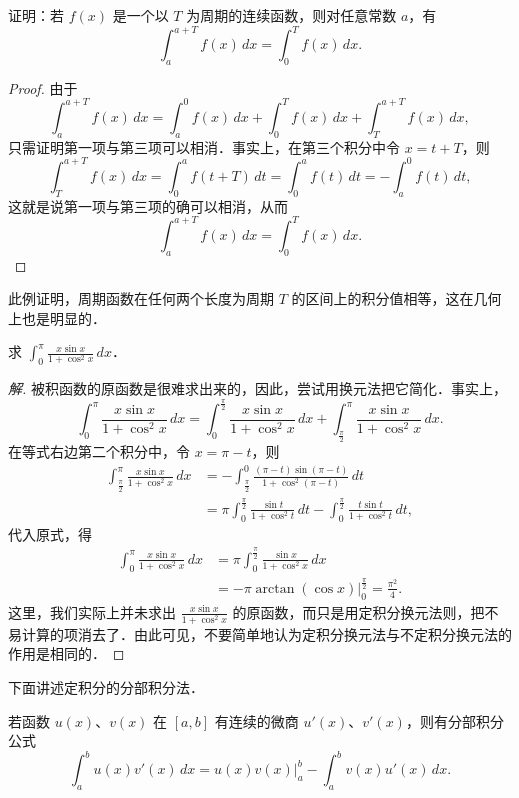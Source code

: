 \begin{example}
证明：若 $f(x)$ 是一个以 $T$ 为周期的连续函数，则对任意常数 $a$，有
\[
\int_a^{a+T}f(x)\,dx = \int_0^T f(x)\,dx.
\]
\end{example}

\begin{proof}
由于
\[
\int_a^{a+T}f(x)\,dx = \int_a^0 f(x)\,dx + \int_0^T f(x)\,dx + \int_T^{a+T}f(x)\,dx,
\]
只需证明第一项与第三项可以相消．事实上，在第三个积分中令 $x = t + T$，则
\[
\int_T^{a+T}f(x)\,dx = \int_0^a f(t + T)\,dt = \int_0^a f(t)\,dt = -\int_a^0 f(t)\,dt,
\]
这就是说第一项与第三项的确可以相消，从而
\[
\int_a^{a+T}f(x)\,dx = \int_0^T f(x)\,dx.
\]
\end{proof}

此例证明，周期函数在任何两个长度为周期 $T$ 的区间上的积分值相等，这在几何上也是明显的．

\begin{example}
求 $\displaystyle \int_0^\pi \frac{x\sin x}{1 + \cos^2 x}\,dx$．
\end{example}

\begin{proof}[解]
被积函数的原函数是很难求出来的，因此，尝试用换元法把它简化．事实上，
\[
\int_0^\pi \frac{x\sin x}{1 + \cos^2 x}\,dx = \int_0^{\frac{\pi}{2}}\frac{x\sin x}{1 + \cos^2 x}\,dx + \int_{\frac{\pi}{2}}^\pi \frac{x\sin x}{1 + \cos^2 x}\,dx.
\]
在等式右边第二个积分中，令 $x = \pi - t$，则
\begin{align*}
\int_{\frac{\pi}{2}}^\pi \frac{x\sin x}{1 + \cos^2 x}\,dx &= -\int_{\frac{\pi}{2}}^0 \frac{(\pi - t)\sin(\pi - t)}{1 + \cos^2(\pi - t)}\,dt \\
&= \pi\int_0^{\frac{\pi}{2}}\frac{\sin t}{1 + \cos^2 t}\,dt - \int_0^{\frac{\pi}{2}}\frac{t\sin t}{1 + \cos^2 t}\,dt,
\end{align*}
代入原式，得
\begin{align*}
\int_0^\pi \frac{x\sin x}{1 + \cos^2 x}\,dx &= \pi\int_0^{\frac{\pi}{2}}\frac{\sin x}{1 + \cos^2 x}\,dx \\
&= -\pi\arctan(\cos x)\bigg|_0^{\frac{\pi}{2}} = \frac{\pi^2}{4}.
\end{align*}
这里，我们实际上并未求出 $\frac{x\sin x}{1 + \cos^2 x}$ 的原函数，而只是用定积分换元法则，把不易计算的项消去了．由此可见，不要简单地认为定积分换元法与不定积分换元法的作用是相同的．
\end{proof}

下面讲述定积分的分部积分法．

\begin{theorem}[定积分分部积分法]\label{thm:7-14}
若函数 $u(x)$、$v(x)$ 在 $[a,b]$ 有连续的微商 $u'(x)$、$v'(x)$，则有分部积分公式
\[
\int_a^b u(x)v'(x)\,dx = u(x)v(x)\bigg|_a^b - \int_a^b v(x)u'(x)\,dx.
\]
\end{theorem}

